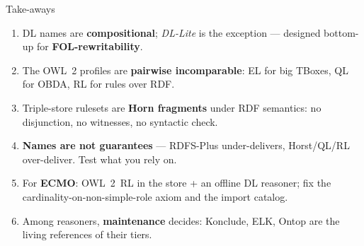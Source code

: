 \documentclass[10pt,aspectratio=169,xcolor=table]{beamer}
\newcommand{\dlliteplain}{\textit{DL-Lite}}
\begin{document}
\begin{frame}{Take-aways}
  \begin{enumerate}
    \item DL names are \textbf{compositional}; \dlliteplain{} is the exception ---
      designed bottom-up for \textbf{FOL-rewritability}.
    \item The OWL~2 profiles are \textbf{pairwise incomparable}: EL for big TBoxes,
      QL for OBDA, RL for rules over RDF.
    \item Triple-store rulesets are \textbf{Horn fragments} under RDF semantics:
      no disjunction, no witnesses, no syntactic check.
    \item \textbf{Names are not guarantees} --- RDFS-Plus under-delivers, Horst/QL/RL
      over-deliver. Test what you rely on.
    \item For \textbf{ECMO}: OWL~2~RL in the store + an offline DL reasoner; fix the
      cardinality-on-non-simple-role axiom and the import catalog.
    \item Among reasoners, \textbf{maintenance} decides: Konclude, ELK, Ontop are the
      living references of their tiers.
  \end{enumerate}
\end{frame}
\end{document}

